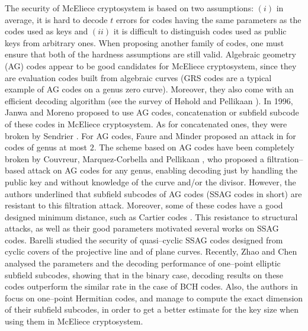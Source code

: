 \documentclass[a4paper]{amsart}
\theoremstyle{definition}
\theoremstyle{remark}
\begin{document}
The security of McEliece cryptosystem is based on two assumptions: $(i)$ in average, it is hard to decode $t$ errors for codes having the same parameters as the codes used as keys and $(ii)$ it is difficult to distinguish codes used as public keys from arbitrary ones. When proposing another family of codes, one must ensure that both of the hardness assumptions are still valid.
Algebraic geometry (AG) codes appear to be good candidates for McEliece cryptosystem, since they are evaluation codes built from algebraic curves (GRS codes are a typical example of AG codes on a genus zero curve). Moreover, they also come with an efficient decoding algorithm (see the survey of H\o hold and Pellikaan \cite{HP95}).
In 1996, Janwa and Moreno \cite{JM96} proposed to use AG codes, concatenation or subfield subcode of these codes in McEliece cryptosystem. As for concatenated ones, they were broken by Sendrier \cite{Sen94}. For AG codes, Faure and Minder proposed an attack in \cite{FM08,Min07,Fau09} for codes of genus at most $2$. The scheme based on AG codes have been completely broken by Couvreur, Marquez-Corbella and Pellikaan \cite{CMR17}, who proposed a filtration--based attack on AG codes for any genus, enabling decoding just by handling the public key and without knowledge of the curve and/or the divisor. However, the authors underlined that subfield subcodes of AG codes (SSAG codes in short) are resistant to this filtration attack. Moreover, some of these codes have a good designed minimum distance, such as Cartier codes \cite{Cou14}. This resistance to structural attacks, as well as their good parameters motivated several works on SSAG codes. Barelli \cite{B18} studied the security of quasi--cyclic SSAG codes designed from cyclic covers of the projective line and of plane curves. Recently, Zhao and Chen \cite{ZC22} analysed the parameters and the decoding performance of one--point elliptic subfield subcodes, showing that in the binary case, decoding results on these codes outperform the similar rate in the case of BCH codes. Also, the authors in \cite{PJ14,EKN21} focus on one--point Hermitian codes, and manage to compute the exact dimension of their subfield subcodes, in order to get a better estimate for the key size when using them in McEliece cryptosystem.
\end{document}
